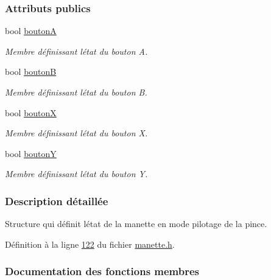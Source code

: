 \subsubsection*{Attributs publics}
\begin{DoxyCompactItemize}
\item 
bool \hyperlink{struct_etat_manette_bouton_a0a1bcb57b5ce1a3f4ff6de5e8749c052}{boutonA}
\begin{DoxyCompactList}\small\item\em Membre définissant l\textquotesingle{}état du bouton A. \end{DoxyCompactList}\item 
bool \hyperlink{struct_etat_manette_bouton_a2a0f4d809b1b9b814fa689113becaad7}{boutonB}
\begin{DoxyCompactList}\small\item\em Membre définissant l\textquotesingle{}état du bouton B. \end{DoxyCompactList}\item 
bool \hyperlink{struct_etat_manette_bouton_a4a1d74300413624fd13841eb11c6e974}{boutonX}
\begin{DoxyCompactList}\small\item\em Membre définissant l\textquotesingle{}état du bouton X. \end{DoxyCompactList}\item 
bool \hyperlink{struct_etat_manette_bouton_aae061f9e32f970787226ef9e0bdb5a17}{boutonY}
\begin{DoxyCompactList}\small\item\em Membre définissant l\textquotesingle{}état du bouton Y. \end{DoxyCompactList}\end{DoxyCompactItemize}


\subsubsection{Description détaillée}
Structure qui définit l\textquotesingle{}état de la manette en mode pilotage de la pince. 

Définition à la ligne \hyperlink{manette_8h_source_l00122}{122} du fichier \hyperlink{manette_8h_source}{manette.\+h}.



\subsubsection{Documentation des fonctions membres}
\mbox{\label{struct_etat_manette_bouton_a6ebd196e0fe68d30a8238b3e12194c93}} 
